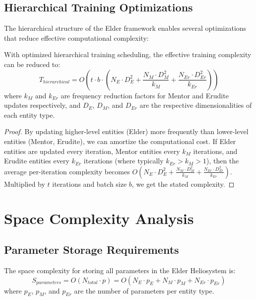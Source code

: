 \subsection{Hierarchical Training Optimizations}

The hierarchical structure of the Elder framework enables several optimizations that reduce effective computational complexity:

\begin{theorem}
With optimized hierarchical training scheduling, the effective training complexity can be reduced to:
\begin{equation}
T_{hierarchical} = O(t \cdot b \cdot (N_E \cdot D_E^2 + \frac{N_M \cdot D_M^2}{k_M} + \frac{N_{Er} \cdot D_{Er}^2}{k_{Er}}))
\end{equation}
where $k_M$ and $k_{Er}$ are frequency reduction factors for Mentor and Erudite updates respectively, and $D_E$, $D_M$, and $D_{Er}$ are the respective dimensionalities of each entity type.
\end{theorem}

\begin{proof}
By updating higher-level entities (Elder) more frequently than lower-level entities (Mentor, Erudite), we can amortize the computational cost. If Elder entities are updated every iteration, Mentor entities every $k_M$ iterations, and Erudite entities every $k_{Er}$ iterations (where typically $k_{Er} > k_M > 1$), then the average per-iteration complexity becomes $O(N_E \cdot D_E^2 + \frac{N_M \cdot D_M^2}{k_M} + \frac{N_{Er} \cdot D_{Er}^2}{k_{Er}})$. Multiplied by $t$ iterations and batch size $b$, we get the stated complexity.
\end{proof}

\section{Space Complexity Analysis}

\subsection{Parameter Storage Requirements}

\begin{theorem}
The space complexity for storing all parameters in the Elder Heliosystem is:
\begin{equation}
S_{parameters} = O(N_{total} \cdot p) = O(N_E \cdot p_E + N_M \cdot p_M + N_{Er} \cdot p_{Er})
\end{equation}
where $p_E$, $p_M$, and $p_{Er}$ are the number of parameters per entity type.
\end{theorem}

